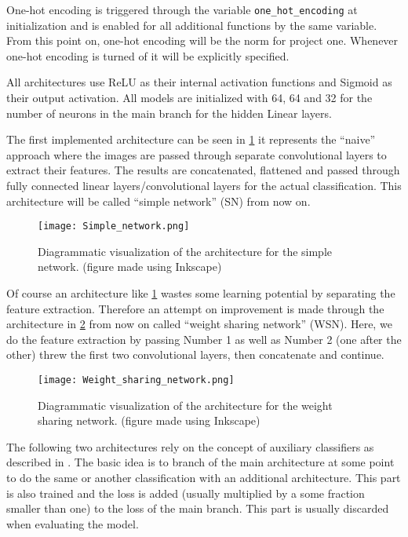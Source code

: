 \documentclass[11pt,english]{article}
\begin{document}
	One-hot encoding is triggered through the variable \lstinline|one_hot_encoding| at initialization and is enabled for all additional functions by the same variable. From this point on, one-hot encoding will be the norm for project one. Whenever one-hot encoding is turned of it will be explicitly specified.
	
	All architectures use ReLU as their internal activation functions and Sigmoid as their output activation. All models are initialized with 64, 64 and 32 for the number of neurons in the main branch for the hidden Linear layers.
	
	The first implemented architecture can be seen in \cref{fig:sn} it represents the ``naive'' approach where the images are passed through separate convolutional layers to extract their features. The results are concatenated, flattened and passed through fully connected linear layers/convolutional layers for the actual classification. This architecture will be called ``simple network'' (SN) from now on.
	
	\begin{figure}[H]
		\centering
		\texttt{[image: Simple\_network.png]}
		\caption{Diagrammatic visualization of the architecture for the simple network. (figure made using Inkscape)}
		\label{fig:sn}
	\end{figure}

	Of course an architecture like \cref{fig:sn} wastes some learning potential by separating the feature extraction. Therefore an attempt on improvement is made through the architecture in \cref{fig:ws} from now on called ``weight sharing network'' (WSN). Here, we do the feature extraction by passing Number 1 as well as Number 2 (one after the other) threw the first two convolutional layers, then concatenate and continue.
	
	\begin{figure}[H]
		\centering
		\texttt{[image: Weight\_sharing\_network.png]}
		\caption{Diagrammatic visualization of the architecture for the weight sharing network. (figure made using Inkscape)}
		\label{fig:ws}
	\end{figure}

	The following two architectures rely on the concept of auxiliary classifiers as described in \cite{Szegedy2014}. The basic idea is to branch of the main architecture at some point to do the same or another classification with an additional architecture. This part is also trained and the loss is added (usually multiplied by a some fraction smaller than one) to the loss of the main branch. This part is usually discarded when evaluating the model.
	
\end{document}

